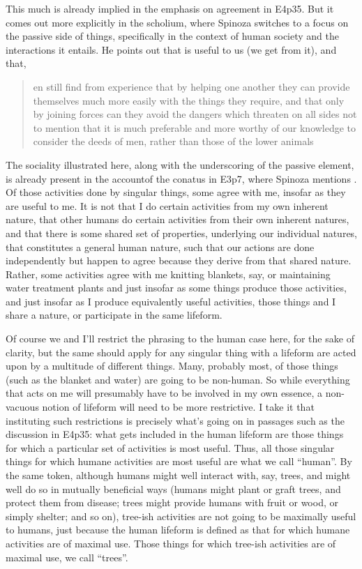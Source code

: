 \documentclass{article}
\newcommand{\dash}{\unskip{—}}
\begin{document}
This much is already implied in the emphasis on agreement in E4p35. But it comes out more explicitly in the scholium, where Spinoza switches to a focus on the passive side of things, specifically in the context of human society and the interactions it entails. He points out that  is useful to us (we get  from it), and that, \blockquote[][.]{en still find from experience that by helping one another they can provide themselves much more easily with the things they require, and that only by joining forces can they avoid the dangers which threaten on all sides \dash not to mention that it is much preferable and more worthy of our knowledge to consider the deeds of men, rather than those of the lower animals} The sociality illustrated here, along with the underscoring of the passive element, is already present in the accountof the conatus in E3p7, where Spinoza mentions . Of those activities done by singular things, some agree with me, insofar as they are useful to me. It is not that I do certain activities from my own inherent nature, that other humans do certain activities from their own inherent natures, and that there is some shared set of properties, underlying our individual natures, that constitutes a general human nature, such that our actions are done independently but happen to agree because they derive from that shared nature. Rather, some activities agree with me \dash knitting blankets, say, or maintaining water treatment plants \dash and just insofar as some things produce those activities, and just insofar as I produce equivalently useful activities, those things and I share a nature, or participate in the same lifeform.

Of course we \dash and I'll restrict the phrasing to the human case here, for the sake of clarity, but the same should apply for any singular thing with a lifeform \dash are acted upon by a multitude of different things. Many, probably most, of those things (such as the blanket and water) are going to be non-human. So while everything that acts on me will presumably have to be involved in my own essence, a non-vacuous notion of lifeform will need to be more restrictive. I take it that instituting such restrictions is precisely what's going on in passages such as the discussion in E4p35: what gets included in the human lifeform are those things for which a particular set of activities is most useful. Thus, all those singular things for which humane activities are most useful are what we call \enquote{human}. By the same token, although humans might well interact with, say, trees, and might well do so in mutually beneficial ways (humans might plant or graft trees, and protect them from disease; trees might provide humans with fruit or wood, or simply shelter; and so on), tree-ish activities are not going to be maximally useful to humans, just because the human lifeform is defined as that for which humane activities are of maximal use. Those things for which tree-ish activities are of maximal use, we call \enquote{trees}.
\end{document}
